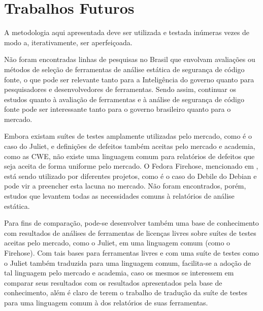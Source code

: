 \section*{Trabalhos Futuros}

A metodologia aqui apresentada deve ser utilizada e testada inúmeras vezes de modo a, iterativamente, ser aperfeiçoada.

Não foram encontradas linhas de pesquisas no Brasil que envolvam avaliações ou métodos de seleção de ferramentas de análise estática de segurança de código fonte, o que pode ser relevante tanto para a Inteligência do governo quanto para pesquisadores e desenvolvedores de ferramentas. Sendo assim, continuar os estudos quanto à avaliação de ferramentas e à análise de segurança de código fonte pode ser interessante tanto para o governo brasileiro quanto para o mercado.

Embora existam suítes de testes amplamente utilizadas pelo mercado, como é o caso do Juliet, e definições de defeitos também aceitas pelo mercado e academia, como as CWE, não existe uma linguagem comum para relatórios de defeitos que seja aceita de forma uniforme pelo mercado. O Fedora Firehose, mencionado em , está sendo utilizado por diferentes projetos, como é o caso do Debile do Debian e pode vir a preencher esta lacuna no mercado. Não foram encontrados, porém, estudos que levantem todas as necessidades comuns à relatórios de análise estática.

Para fins de comparação, pode-se desenvolver também uma base de conhecimento com resultados de análises de  ferramentas de licenças livres sobre suítes de testes aceitas pelo mercado, como o Juliet, em uma linguagem comum (como o Firehose). Com tais bases para ferramentas livres e com uma suíte de testes como o Juliet também traduzida para uma linguagem comum, facilita-se a adoção de tal linguagem pelo mercado e academia, caso os mesmos se interessem em comparar seus resultados com os resultados apresentados pela base de conhecimento, além é claro de terem o trabalho de tradução da suíte de testes para uma linguagem comum à dos relatórios de suas ferramentas.

